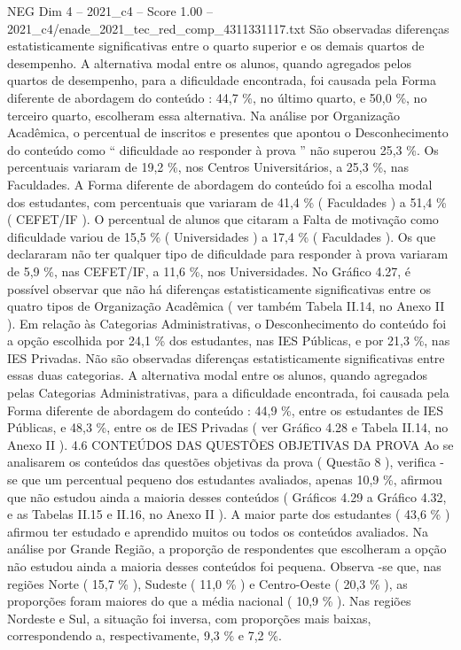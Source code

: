 \begin{textsample}{NEG Dim 4 – 2021\_c4 – Score 1.00 – 2021\_c4/enade\_2021\_tec\_red\_comp\_4311331117.txt}
São observadas diferenças estatisticamente significativas entre o quarto superior e os demais quartos de desempenho.
A alternativa modal entre os alunos, quando agregados pelos quartos de desempenho, para a dificuldade encontrada, foi causada pela Forma diferente de abordagem do conteúdo : 44,7 \%, no último quarto, e 50,0 \%, no terceiro quarto, escolheram essa alternativa.
Na análise por Organização Acadêmica, o percentual de inscritos e presentes que apontou o Desconhecimento do conteúdo como “ dificuldade ao responder à prova ” não superou 25,3 \%.
Os percentuais variaram de 19,2 \%, nos Centros Universitários, a 25,3 \%, nas Faculdades.
A Forma diferente de abordagem do conteúdo foi a escolha modal dos estudantes, com percentuais que variaram de 41,4 \% ( Faculdades ) a 51,4 \% ( CEFET/IF ).
O percentual de alunos que citaram a Falta de motivação como dificuldade variou de 15,5 \% ( Universidades ) a 17,4 \% ( Faculdades ).
Os que declararam não ter qualquer tipo de dificuldade para responder à prova variaram de 5,9 \%, nas CEFET/IF, a 11,6 \%, nos Universidades.
No Gráfico 4.27, é possível observar que não há diferenças estatisticamente significativas entre os quatro tipos de Organização Acadêmica ( ver também Tabela II.14, no Anexo II ).
Em relação às Categorias Administrativas, o Desconhecimento do conteúdo foi a opção escolhida por 24,1 \% dos estudantes, nas IES Públicas, e por 21,3 \%, nas IES Privadas.
Não são observadas diferenças estatisticamente significativas entre essas duas categorias.
A alternativa modal entre os alunos, quando agregados pelas Categorias Administrativas, para a dificuldade encontrada, foi causada pela Forma diferente de abordagem do conteúdo : 44,9 \%, entre os estudantes de IES Públicas, e 48,3 \%, entre os de IES Privadas ( ver Gráfico 4.28 e Tabela II.14, no Anexo II ). 4.6 CONTEÚDOS DAS QUESTÕES OBJETIVAS DA PROVA Ao se analisarem os conteúdos das questões objetivas da prova ( Questão 8 ), verifica -se que um percentual pequeno dos estudantes avaliados, apenas 10,9 \%, afirmou que não estudou ainda a maioria desses conteúdos ( Gráficos 4.29 a Gráfico 4.32, e as Tabelas II.15 e II.16, no Anexo II ).
A maior parte dos estudantes ( 43,6 \% ) afirmou ter estudado e aprendido muitos ou todos os conteúdos avaliados.
Na análise por Grande Região, a proporção de respondentes que escolheram a opção não estudou ainda a maioria desses conteúdos foi pequena.
Observa -se que, nas regiões Norte ( 15,7 \% ), Sudeste ( 11,0 \% ) e Centro-Oeste ( 20,3 \% ), as proporções foram maiores do que a média nacional ( 10,9 \% ).
Nas regiões Nordeste e Sul, a situação foi inversa, com proporções mais baixas, correspondendo a, respectivamente, 9,3 \% e 7,2 \%.

\end{textsample}
